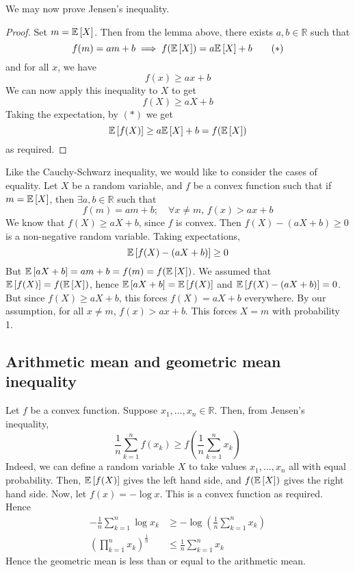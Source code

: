 We may now prove Jensen's inequality.
\begin{proof}
	Set \(m = \mathbb{E}\left[{X}\right]\).
	Then from the lemma above, there exists \(a, b \in \mathbb R\) such that
	\begin{equation}
		f(m) = am + b \implies f(\mathbb{E}\left[{X}\right]) = a\mathbb{E}\left[{X}\right] + b \tag{\(\ast\)}
	\end{equation}
	and for all \(x\), we have
	\[
		f(x) \geq ax + b
	\]
	We can now apply this inequality to \(X\) to get
	\[
		f(X) \geq aX + b
	\]
	Taking the expectation, by \((\ast)\) we get
	\[
		\mathbb{E}\left[{f(X)}\right] \geq a\mathbb{E}\left[{X}\right] + b = f(\mathbb{E}\left[{X}\right])
	\]
	as required.
\end{proof}
Like the Cauchy-Schwarz inequality, we would like to consider the cases of equality.
Let \(X\) be a random variable, and \(f\) be a convex function such that if \(m = \mathbb{E}\left[{X}\right]\), then \(\exists a, b \in \mathbb R\) such that
\[
	f(m) = am + b;\quad \forall x \neq m,\, f(x) > ax + b
\]
We know that \(f(X) \geq aX + b\), since \(f\) is convex.
Then \(f(X) - (aX+b) \geq 0\) is a non-negative random variable.
Taking expectations,
\[
	\mathbb{E}\left[{f(X) - (aX+b)}\right] \geq 0
\]
But \(\mathbb{E}\left[{aX + b}\right] = am + b = f(m) = f(\mathbb{E}\left[{X}\right])\).
We assumed that \(\mathbb{E}\left[{f(X)}\right] = f(\mathbb{E}\left[{X}\right])\), hence \(\mathbb{E}\left[{aX+b}\right] = \mathbb{E}\left[{f(X)}\right]\) and \(\mathbb{E}\left[{f(X) - (aX+b)}\right] = 0\).
But since \(f(X) \geq aX+b\), this forces \(f(X) = aX+b\) everywhere.
By our assumption, for all \(x \neq m\), \(f(x) > ax+b\).
This forces \(X=m\) with probability 1.

\subsection{Arithmetic mean and geometric mean inequality}
Let \(f\) be a convex function.
Suppose \(x_1, \dots, x_n \in \mathbb R\).
Then, from Jensen's inequality,
\[
	\frac{1}{n} \sum_{k=1}^n f(x_k) \geq f\left( \frac{1}{n} \sum_{k=1}^n x_k \right)
\]
Indeed, we can define a random variable \(X\) to take values \(x_1, \dots, x_n\) all with equal probability.
Then, \(\mathbb{E}\left[{f(X)}\right]\) gives the left hand side, and \(f(\mathbb{E}\left[{X}\right])\) gives the right hand side.
Now, let \(f(x) = -\log x\).
This is a convex function as required.
Hence
\begin{align*}
	-\frac{1}{n} \sum_{k=1}^n \log x_k             & \geq -\log\left( \frac{1}{n} \sum_{k=1}^n x_k \right) \\
	\left( \prod_{k=1}^n x_k \right)^{\frac{1}{n}} & \leq \frac{1}{n} \sum_{k=1}^n x_k
\end{align*}
Hence the geometric mean is less than or equal to the arithmetic mean.
